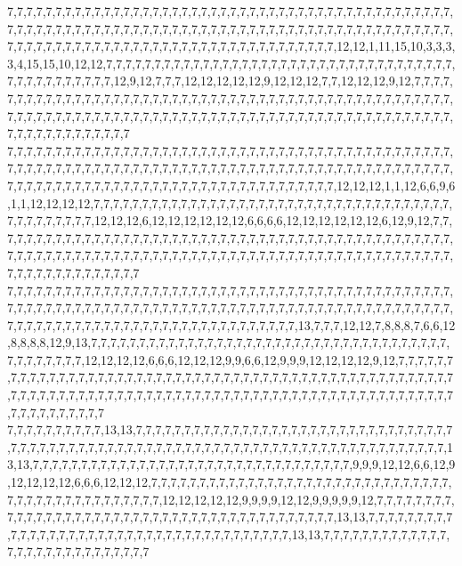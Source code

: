 7,7,7,7,7,7,7,7,7,7,7,7,7,7,7,7,7,7,7,7,7,7,7,7,7,7,7,7,7,7,7,7,7,7,7,7,7,7,7,7,7,7,7,7,7,7,7,7,7,7,7,7,7,7,7,7,7,7,7,7,7,7,7,7,7,7,7,7,7,7,7,7,7,7,7,7,7,7,7,7,7,7,7,7,7,7,7,7,7,7,7,7,7,7,7,7,7,7,7,7,7,7,7,7,7,7,7,7,7,7,7,7,7,7,7,7,7,7,7,7,7,7,7,7,7,7,12,12,1,11,15,10,3,3,3,3,4,15,15,10,12,12,7,7,7,7,7,7,7,7,7,7,7,7,7,7,7,7,7,7,7,7,7,7,7,7,7,7,7,7,7,7,7,7,7,7,7,7,7,7,7,7,7,7,7,7,7,7,7,12,9,12,7,7,7,12,12,12,12,12,9,12,12,12,7,7,12,12,12,9,12,7,7,7,7,7,7,7,7,7,7,7,7,7,7,7,7,7,7,7,7,7,7,7,7,7,7,7,7,7,7,7,7,7,7,7,7,7,7,7,7,7,7,7,7,7,7,7,7,7,7,7,7,7,7,7,7,7,7,7,7,7,7,7,7,7,7,7,7,7,7,7,7,7,7,7,7,7,7,7,7,7,7,7,7,7,7,7,7,7,7,7,7,7,7,7,7,7,7,7,7,7,7,7,7,7,7,7,7,7
7,7,7,7,7,7,7,7,7,7,7,7,7,7,7,7,7,7,7,7,7,7,7,7,7,7,7,7,7,7,7,7,7,7,7,7,7,7,7,7,7,7,7,7,7,7,7,7,7,7,7,7,7,7,7,7,7,7,7,7,7,7,7,7,7,7,7,7,7,7,7,7,7,7,7,7,7,7,7,7,7,7,7,7,7,7,7,7,7,7,7,7,7,7,7,7,7,7,7,7,7,7,7,7,7,7,7,7,7,7,7,7,7,7,7,7,7,7,7,7,7,7,7,7,7,7,12,12,12,1,1,12,6,6,9,6,1,1,12,12,12,12,7,7,7,7,7,7,7,7,7,7,7,7,7,7,7,7,7,7,7,7,7,7,7,7,7,7,7,7,7,7,7,7,7,7,7,7,7,7,7,7,7,7,7,7,7,7,12,12,12,6,12,12,12,12,12,12,6,6,6,6,12,12,12,12,12,12,6,12,9,12,7,7,7,7,7,7,7,7,7,7,7,7,7,7,7,7,7,7,7,7,7,7,7,7,7,7,7,7,7,7,7,7,7,7,7,7,7,7,7,7,7,7,7,7,7,7,7,7,7,7,7,7,7,7,7,7,7,7,7,7,7,7,7,7,7,7,7,7,7,7,7,7,7,7,7,7,7,7,7,7,7,7,7,7,7,7,7,7,7,7,7,7,7,7,7,7,7,7,7,7,7,7,7,7,7,7,7,7
7,7,7,7,7,7,7,7,7,7,7,7,7,7,7,7,7,7,7,7,7,7,7,7,7,7,7,7,7,7,7,7,7,7,7,7,7,7,7,7,7,7,7,7,7,7,7,7,7,7,7,7,7,7,7,7,7,7,7,7,7,7,7,7,7,7,7,7,7,7,7,7,7,7,7,7,7,7,7,7,7,7,7,7,7,7,7,7,7,7,7,7,7,7,7,7,7,7,7,7,7,7,7,7,7,7,7,7,7,7,7,7,7,7,7,7,7,7,7,7,7,7,13,7,7,7,12,12,7,8,8,8,7,6,6,12,8,8,8,8,12,9,13,7,7,7,7,7,7,7,7,7,7,7,7,7,7,7,7,7,7,7,7,7,7,7,7,7,7,7,7,7,7,7,7,7,7,7,7,7,7,7,7,7,7,7,7,7,12,12,12,12,6,6,6,12,12,12,9,9,6,6,12,9,9,9,12,12,12,12,9,12,7,7,7,7,7,7,7,7,7,7,7,7,7,7,7,7,7,7,7,7,7,7,7,7,7,7,7,7,7,7,7,7,7,7,7,7,7,7,7,7,7,7,7,7,7,7,7,7,7,7,7,7,7,7,7,7,7,7,7,7,7,7,7,7,7,7,7,7,7,7,7,7,7,7,7,7,7,7,7,7,7,7,7,7,7,7,7,7,7,7,7,7,7,7,7,7,7,7,7,7,7,7,7,7,7,7,7,7
7,7,7,7,7,7,7,7,7,7,13,13,7,7,7,7,7,7,7,7,7,7,7,7,7,7,7,7,7,7,7,7,7,7,7,7,7,7,7,7,7,7,7,7,7,7,7,7,7,7,7,7,7,7,7,7,7,7,7,7,7,7,7,7,7,7,7,7,7,7,7,7,7,7,7,7,7,7,7,7,7,7,7,7,7,7,7,7,7,7,13,13,7,7,7,7,7,7,7,7,7,7,7,7,7,7,7,7,7,7,7,7,7,7,7,7,7,7,7,7,7,7,7,7,7,9,9,9,12,12,6,6,12,9,12,12,12,12,6,6,6,12,12,12,7,7,7,7,7,7,7,7,7,7,7,7,7,7,7,7,7,7,7,7,7,7,7,7,7,7,7,7,7,7,7,7,7,7,7,7,7,7,7,7,7,7,7,7,7,7,7,12,12,12,12,12,9,9,9,9,12,12,9,9,9,9,9,12,7,7,7,7,7,7,7,7,7,7,7,7,7,7,7,7,7,7,7,7,7,7,7,7,7,7,7,7,7,7,7,7,7,7,7,7,7,7,7,7,7,7,13,13,7,7,7,7,7,7,7,7,7,7,7,7,7,7,7,7,7,7,7,7,7,7,7,7,7,7,7,7,7,7,7,7,7,7,7,7,7,7,13,13,7,7,7,7,7,7,7,7,7,7,7,7,7,7,7,7,7,7,7,7,7,7,7,7,7,7,7,7
